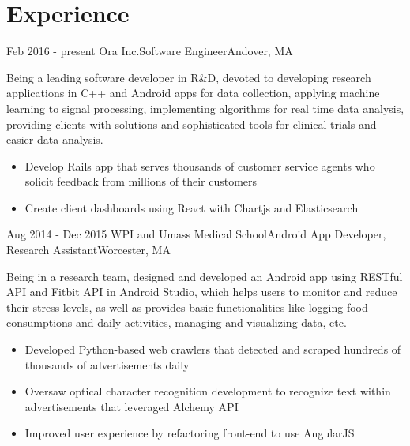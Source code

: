 \documentclass[12pt,a4paper,merriweather]{moderncv}        %
\begin{document}
\makecvtitle
\vspace{-1.5cm}

\section{Experience}

\cventry
{Feb 2016 - present}
{Ora Inc.}{Software Engineer}{Andover, MA}{}
{Being a leading software developer in R\&D, devoted to developing research applications in C++ and Android apps for data collection, applying machine learning to signal processing, implementing algorithms for real time data analysis, providing clients with solutions and sophisticated tools for clinical trials and easier data analysis.
\begin{itemize}
\item Develop Rails app that serves thousands of customer service agents who solicit feedback from millions of their customers
\item Create client dashboards using React with Chartjs and Elasticsearch
\end{itemize}}
\vspace{.15cm}

\cventry
{Aug 2014 - Dec 2015}
{WPI and Umass Medical School}{Android App Developer, Research Assistant}{Worcester, MA}{}
{Being in a research team, designed and developed an Android app using RESTful API and Fitbit API in Android Studio, which helps users to monitor and reduce their stress levels, as well as provides basic functionalities like logging food consumptions and daily activities, managing and visualizing data, etc. 
\begin{itemize}
\item Developed Python-based web crawlers that detected and scraped hundreds of thousands of advertisements daily
\item Oversaw optical character recognition development to recognize text within advertisements that leveraged Alchemy API
\item Improved user experience by refactoring front-end to use AngularJS
\end{itemize}}
\vspace{.15cm}

\end{document}
